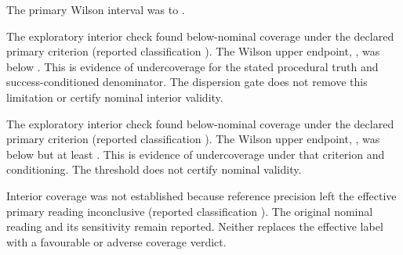 The primary Wilson interval was  to . %

The exploratory interior check found below-nominal coverage under the declared primary criterion (reported classification \texttt{}). The Wilson upper endpoint, , was below . %
This is evidence of undercoverage for the stated procedural truth and success-conditioned denominator. The dispersion gate does not remove this limitation or certify nominal interior validity. %

The exploratory interior check found below-nominal coverage under the declared primary criterion (reported classification \texttt{}). The Wilson upper endpoint, , was below  but at least . %
This is evidence of undercoverage under that criterion and conditioning. The threshold does not certify nominal validity. %

Interior coverage was not established because reference precision left the effective primary reading inconclusive (reported classification \texttt{}). %
The original nominal reading and its sensitivity remain reported. Neither replaces the effective label with a favourable or adverse coverage verdict. %

